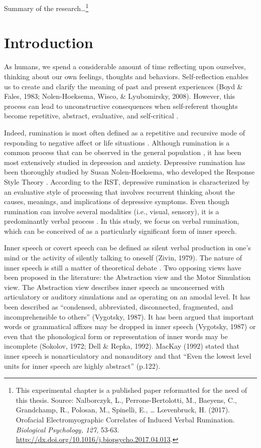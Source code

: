 \documentclass[a4paper,12pt,oneside,oldfontcommands]{memoir}
\let\rmarkdownfootnote\footnote%
\def\footnote{\protect\rmarkdownfootnote}
\begin{document}
Summary of the research\ldots{}\footnote{This experimental chapter is a
  published paper reformatted for the need of this thesis. Source:
  Nalborczyk, L., Perrone-Bertolotti, M., Baeyens, C., Grandchamp, R.,
  Polosan, M., Spinelli, E., \ldots{} L\oe venbruck, H. (2017).
  Orofacial Electromyographic Correlates of Induced Verbal Rumination.
  \emph{Biological Psychology, 127}, 53-63.
  \url{http://dx.doi.org/10.1016/j.biopsycho.2017.04.013}.}

\section{Introduction}\label{introduction}

As humans, we spend a considerable amount of time reflecting upon
ourselves, thinking about our own feelings, thoughts and behaviors.
Self-reflection enables us to create and clarify the meaning of past and
present experiences (Boyd \& Fales, 1983; Nolen-Hoeksema, Wisco, \&
Lyubomirsky, 2008). However, this process can lead to unconstructive
consequences when self-referent thoughts become repetitive, abstract,
evaluative, and self-critical \citep{Watkins2008}.

Indeed, rumination is most often defined as a repetitive and recursive
mode of responding to negative affect \citep{Rippere1977} or life
situations \citep{Robinson2003}. Although rumination is a common process
that can be observed in the general population \citep{Watkins2008}, it
has been most extensively studied in depression and anxiety. Depressive
rumination has been thoroughly studied by Susan Nolen-Hoeksema, who
developed the Response Style Theory
\citep[RST,][]{nolen-hoeksema_responses_1991}. According to the RST,
depressive rumination is characterized by an evaluative style of
processing that involves recurrent thinking about the causes, meanings,
and implications of depressive symptoms. Even though rumination can
involve several modalities (i.e., visual, sensory), it is a
predominantly verbal process
\citep{goldwin_concreteness_2012, mclaughlin_effects_2007}. In this
study, we focus on verbal rumination, which can be conceived of as a
particularly significant form of inner speech.

Inner speech or covert speech can be defined as silent verbal production
in one's mind or the activity of silently talking to oneself (Zivin,
1979). The nature of inner speech is still a matter of theoretical
debate \citep[see][ for a review]{Perrone-Bertolotti2014}. Two opposing
views have been proposed in the literature: the Abstraction view and the
Motor Simulation view. The Abstraction view describes inner speech as
unconcerned with articulatory or auditory simulations and as operating
on an amodal level. It has been described as ``condensed, abbreviated,
disconnected, fragmented, and incomprehensible to others'' (Vygotsky,
1987). It has been argued that important words or grammatical affixes
may be dropped in inner speech (Vygotsky, 1987) or even that the
phonological form or representation of inner words may be incomplete
(Sokolov, 1972; Dell \& Repka, 1992). MacKay (1992) stated that inner
speech is nonarticulatory and nonauditory and that ``Even the lowest
level units for inner speech are highly abstract'' (p.122).
\end{document}
